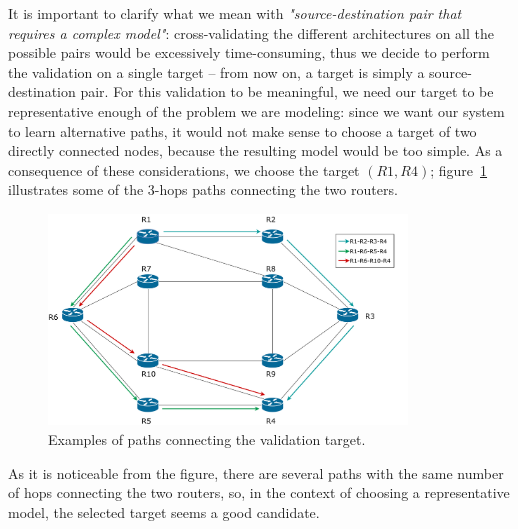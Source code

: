 It is important to clarify what we mean with \textit{"source-destination pair that requires a complex model"}: cross-validating the different architectures on all the possible pairs would be excessively time-consuming, thus we decide to perform the validation on a single target -- from now on, a target is simply a source-destination pair. For this validation to be meaningful, we need our target to be representative enough of the problem we are modeling: since we want our system to learn alternative paths, it would not make sense to choose a target of two directly connected nodes, because the resulting model would be too simple. As a consequence of these considerations, we choose the target $(R1, R4)$; figure~\ref{fig:validation_target} illustrates some of the 3-hops paths connecting the two routers.
\begin{figure}[]
\centering
\includegraphics[width=0.85\textwidth]{img/validation_target}
\caption{Examples of paths connecting the validation target.}
\label{fig:validation_target}
\end{figure}
As it is noticeable from the figure, there are several paths with the same number of hops connecting the two routers, so, in the context of choosing a representative model, the selected target seems a good candidate.

